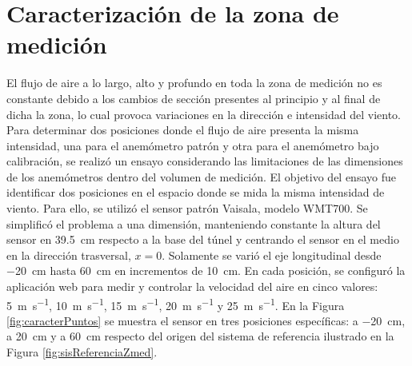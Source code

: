 \section{Caracterización de la zona de medición}\label{sec:caracterZonaMed}
El flujo de aire a lo largo, alto y profundo en toda la zona de medición no es constante debido a los cambios de sección presentes al principio y al final de dicha la zona, lo cual provoca variaciones en la dirección e  intensidad del viento. Para determinar dos posiciones donde el flujo de aire presenta la misma intensidad, una para el anemómetro patrón y otra para el anemómetro bajo calibración, se realizó un ensayo considerando las limitaciones de las dimensiones de los anemómetros dentro del volumen de medición. El objetivo del ensayo fue identificar dos posiciones en el espacio donde se mida la misma intensidad de viento. Para ello, se utilizó el sensor patrón Vaisala, modelo WMT700. Se simplificó el problema a una dimensión, manteniendo constante la altura del sensor en \SI{39.5}{\centi\meter} respecto a la base del túnel y centrando el sensor en el medio en la dirección trasversal, $x=0$. Solamente se varió el eje longitudinal desde \SI{-20}{\centi\meter} hasta \SI{60}{\centi\meter} en incrementos de \SI{10}{\centi\meter}. En cada posición, se configuró la aplicación web para medir y controlar la velocidad del aire en cinco valores: \SI{5}{\meter\per\second}, \SI{10}{\meter\per\second}, \SI{15}{\meter\per\second}, \SI{20}{\meter\per\second} y \SI{25}{\meter\per\second}. En la Figura \ref{fig:caracterPuntos} se muestra el sensor en tres posiciones específicas: a \SI{-20}{\centi\meter}, a \SI{20}{\centi\meter} y a \SI{60}{\centi\meter} respecto del origen del sistema de referencia ilustrado en la Figura \ref{fig:sisReferenciaZmed}.


